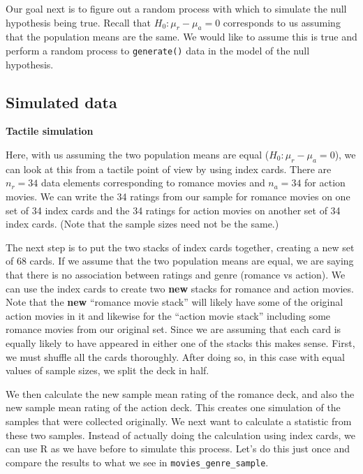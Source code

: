 \documentclass[12pt, krantz2,]{krantz}
\begin{document}
Our goal next is to figure out a random process with which to simulate the null hypothesis being true. Recall that \(H_0: \mu_r - \mu_a = 0\) corresponds to us assuming that the population means are the same. We would like to assume this is true and perform a random process to \texttt{generate()} data in the model of the null hypothesis.

\hypertarget{simulated-data}{%
\subsection{Simulated data}\label{simulated-data}}

\textbf{Tactile simulation}

Here, with us assuming the two population means are equal (\(H_0: \mu_r - \mu_a = 0\)), we can look at this from a tactile point of view by using index cards. There are \(n_r = 34\) data elements corresponding to romance movies and \(n_a = 34\) for action movies. We can write the 34 ratings from our sample for romance movies on one set of 34 index cards and the 34 ratings for action movies on another set of 34 index cards. (Note that the sample sizes need not be the same.)

The next step is to put the two stacks of index cards together, creating a new set of 68 cards. If we assume that the two population means are equal, we are saying that there is no association between ratings and genre (romance vs action). We can use the index cards to create two \textbf{new} stacks for romance and action movies. Note that the \textbf{new} ``romance movie stack'' will likely have some of the original action movies in it and likewise for the ``action movie stack'' including some romance movies from our original set. Since we are assuming that each card is equally likely to have appeared in either one of the stacks this makes sense. First, we must shuffle all the cards thoroughly. After doing so, in this case with equal values of sample sizes, we split the deck in half.

We then calculate the new sample mean rating of the romance deck, and also the new sample mean rating of the action deck. This creates one simulation of the samples that were collected originally. We next want to calculate a statistic from these two samples. Instead of actually doing the calculation using index cards, we can use R as we have before to simulate this process. Let's do this just once and compare the results to what we see in \texttt{movies\_genre\_sample}.
\end{document}

